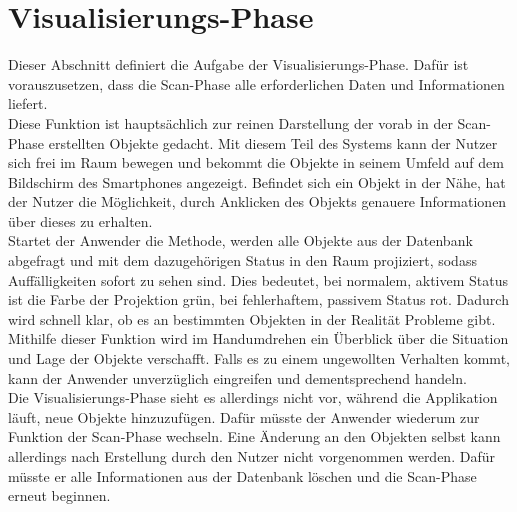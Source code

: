 \section{Visualisierungs-Phase}
\label{chap:Visualisierungs-Phase}
Dieser Abschnitt definiert die Aufgabe der Visualisierungs-Phase. 
Dafür ist vorauszusetzen, dass die Scan-Phase alle erforderlichen Daten und Informationen liefert. 
\\ 
\linebreak
Diese Funktion ist hauptsächlich zur reinen Darstellung der vorab in der Scan-Phase erstellten Objekte gedacht. Mit diesem Teil des Systems 
kann der Nutzer sich frei im Raum bewegen und bekommt die Objekte in seinem Umfeld auf dem Bildschirm des Smartphones angezeigt. 
Befindet sich ein Objekt in der Nähe, hat der Nutzer die Möglichkeit, durch Anklicken des Objekts genauere Informationen über dieses zu erhalten. 
\\ 
\linebreak 
Startet der Anwender die Methode, werden alle Objekte aus der Datenbank abgefragt und mit dem dazugehörigen Status in den Raum 
projiziert, sodass Auffälligkeiten sofort zu sehen sind. Dies bedeutet, bei normalem, aktivem Status ist die Farbe der Projektion grün, 
bei fehlerhaftem, passivem Status rot. Dadurch wird schnell klar, ob es an bestimmten Objekten in der Realität Probleme gibt. Mithilfe dieser 
Funktion wird im Handumdrehen ein Überblick über die Situation und Lage der Objekte verschafft. Falls es zu einem ungewollten Verhalten kommt, 
kann der Anwender unverzüglich eingreifen und dementsprechend handeln. %
\\ 
Die Visualisierungs-Phase sieht es allerdings nicht vor, während die Applikation läuft, neue Objekte hinzuzufügen. Dafür müsste der Anwender wiederum zur 
Funktion der Scan-Phase wechseln. Eine Änderung an den Objekten selbst kann allerdings nach Erstellung durch den Nutzer nicht vorgenommen werden. Dafür müsste 
er alle Informationen aus der Datenbank löschen und die Scan-Phase erneut beginnen. 

